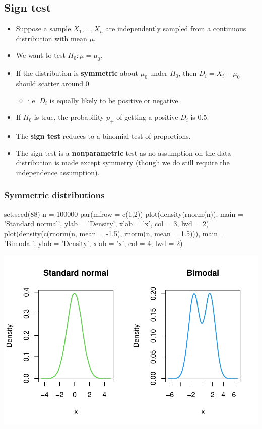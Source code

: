 \documentclass[a4paper]{article}\usepackage[]{graphicx}\usepackage[]{xcolor}
\makeatletter
\def\maxwidth{ %
  \ifdim\Gin@nat@width>\linewidth
    \linewidth
  \else
    \Gin@nat@width
  \fi
}
\makeatother
\begin{document}
\subsection{Sign test}
\begin{itemize}
	\item Suppose a sample \( X_1,\dotsc,X_n \) are independently sampled from a continuous distribution with mean \( \mu \).
	\item We want to test \( H_0: \mu = \mu_0 \).
	\item If the distribution is \textcolor{myred}{\textbf{symmetric}} about \( \mu_0 \) under \( H_0 \), then \( D_i = X_i - \mu_0 \) should scatter around 0
	\begin{itemize}
		\item i.e. \( D_i \) is equally likely to be positive or negative.
	\end{itemize}
	\item If \( H_0 \) is true, the probability \( p_{+} \) of getting a positive \( D_i \) is 0.5.
	\item The \textcolor{myred}{\textbf{sign test}} reduces to a binomial test of proportions.
	\item The sign test is a \textcolor{myred}{\textbf{nonparametric}} test as no assumption on the data distribution is made except symmetry (though we do still require the independence assumption).
\end{itemize}
\subsubsection{Symmetric distributions}
\begin{Schunk}
\begin{Sinput}
set.seed(88)
n = 100000
par(mfrow = c(1,2))
plot(density(rnorm(n)),
     main = 'Standard normal', ylab = 'Density', xlab = 'x', col = 3, lwd = 2)
plot(density(c(rnorm(n, mean = -1.5), rnorm(n, mean = 1.5))),
     main = 'Bimodal', ylab = 'Density', xlab = 'x', col = 4, lwd = 2)
\end{Sinput}


{\centering \includegraphics[width=\maxwidth]{figure/listings-unnamed-chunk-109-1} 

}

\end{Schunk}
\end{document}

